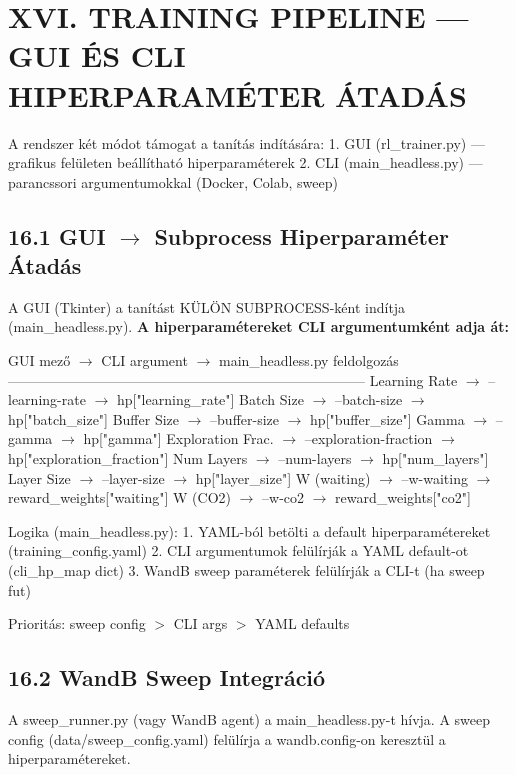 \documentclass[11pt,a4paper]{article}
\begin{document}
\section*{XVI. TRAINING PIPELINE — GUI ÉS CLI HIPERPARAMÉTER ÁTADÁS}

A rendszer két módot támogat a tanítás indítására:
1. GUI (rl\_trainer.py) — grafikus felületen beállítható hiperparaméterek
2. CLI (main\_headless.py) — parancssori argumentumokkal (Docker, Colab, sweep)

\subsection*{16.1 GUI $\rightarrow$ Subprocess Hiperparaméter Átadás}
A GUI (Tkinter) a tanítást KÜLÖN SUBPROCESS-ként indítja (main\_headless.py).
\textbf{A hiperparamétereket CLI argumentumként adja át:}

GUI mező           $\rightarrow$ CLI argument           $\rightarrow$ main\_headless.py feldolgozás
-----------------------------------------------------------------------------
Learning Rate       $\rightarrow$ --learning-rate        $\rightarrow$ hp["learning\_rate"]
Batch Size          $\rightarrow$ --batch-size           $\rightarrow$ hp["batch\_size"]
Buffer Size         $\rightarrow$ --buffer-size          $\rightarrow$ hp["buffer\_size"]
Gamma               $\rightarrow$ --gamma               $\rightarrow$ hp["gamma"]
Exploration Frac.   $\rightarrow$ --exploration-fraction $\rightarrow$ hp["exploration\_fraction"]
Num Layers          $\rightarrow$ --num-layers           $\rightarrow$ hp["num\_layers"]
Layer Size          $\rightarrow$ --layer-size           $\rightarrow$ hp["layer\_size"]
W (waiting)         $\rightarrow$ --w-waiting            $\rightarrow$ reward\_weights["waiting"]
W (CO2)             $\rightarrow$ --w-co2               $\rightarrow$ reward\_weights["co2"]

Logika (main\_headless.py):
1. YAML-ból betölti a default hiperparamétereket (training\_config.yaml)
2. CLI argumentumok felülírják a YAML default-ot (cli\_hp\_map dict)
3. WandB sweep paraméterek felülírják a CLI-t (ha sweep fut)

Prioritás: sweep config $>$ CLI args $>$ YAML defaults

\subsection*{16.2 WandB Sweep Integráció}
A sweep\_runner.py (vagy WandB agent) a main\_headless.py-t hívja.
A sweep config (data/sweep\_config.yaml) felülírja a wandb.config-on
keresztül a hiperparamétereket.
\end{document}

